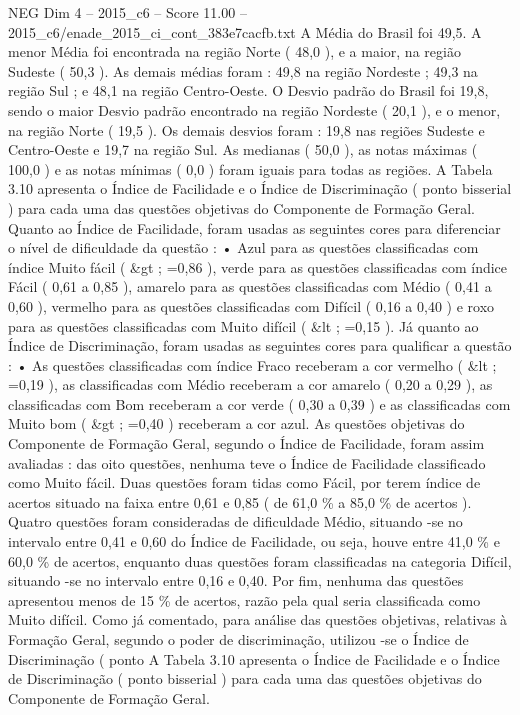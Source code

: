 \begin{textsample}{NEG Dim 4 – 2015\_c6 – Score 11.00 – 2015\_c6/enade\_2015\_ci\_cont\_383e7cacfb.txt}
A Média do Brasil foi 49,5.
A menor Média foi encontrada na região Norte ( 48,0 ), e a maior, na região Sudeste ( 50,3 ).
As demais médias foram : 49,8 na região Nordeste ; 49,3 na região Sul ; e 48,1 na região Centro-Oeste.
O Desvio padrão do Brasil foi 19,8, sendo o maior Desvio padrão encontrado na região Nordeste ( 20,1 ), e o menor, na região Norte ( 19,5 ).
Os demais desvios foram : 19,8 nas regiões Sudeste e Centro-Oeste e 19,7 na região Sul.
As medianas ( 50,0 ), as notas máximas ( 100,0 ) e as notas mínimas ( 0,0 ) foram iguais para todas as regiões.
A Tabela 3.10 apresenta o Índice de Facilidade e o Índice de Discriminação ( ponto bisserial ) para cada uma das questões objetivas do Componente de Formação Geral.
Quanto ao Índice de Facilidade, foram usadas as seguintes cores para diferenciar o nível de dificuldade da questão : • Azul para as questões classificadas com índice Muito fácil ( \&gt ; =0,86 ), verde para as questões classificadas com índice Fácil ( 0,61 a 0,85 ), amarelo para as questões classificadas com Médio ( 0,41 a 0,60 ), vermelho para as questões classificadas com Difícil ( 0,16 a 0,40 ) e roxo para as questões classificadas com Muito difícil ( \&lt ; =0,15 ).
Já quanto ao Índice de Discriminação, foram usadas as seguintes cores para qualificar a questão : • As questões classificadas com índice Fraco receberam a cor vermelho ( \&lt ; =0,19 ), as classificadas com Médio receberam a cor amarelo ( 0,20 a 0,29 ), as classificadas com Bom receberam a cor verde ( 0,30 a 0,39 ) e as classificadas com Muito bom ( \&gt ; =0,40 ) receberam a cor azul.
As questões objetivas do Componente de Formação Geral, segundo o Índice de Facilidade, foram assim avaliadas : das oito questões, nenhuma teve o Índice de Facilidade classificado como Muito fácil.
Duas questões foram tidas como Fácil, por terem índice de acertos situado na faixa entre 0,61 e 0,85 ( de 61,0 \% a 85,0 \% de acertos ).
Quatro questões foram consideradas de dificuldade Médio, situando -se no intervalo entre 0,41 e 0,60 do Índice de Facilidade, ou seja, houve entre 41,0 \% e 60,0 \% de acertos, enquanto duas questões foram classificadas na categoria Difícil, situando -se no intervalo entre 0,16 e 0,40.
Por fim, nenhuma das questões apresentou menos de 15 \% de acertos, razão pela qual seria classificada como Muito difícil.
Como já comentado, para análise das questões objetivas, relativas à Formação Geral, segundo o poder de discriminação, utilizou -se o Índice de Discriminação ( ponto A Tabela 3.10 apresenta o Índice de Facilidade e o Índice de Discriminação ( ponto bisserial ) para cada uma das questões objetivas do Componente de Formação Geral.

\end{textsample}

